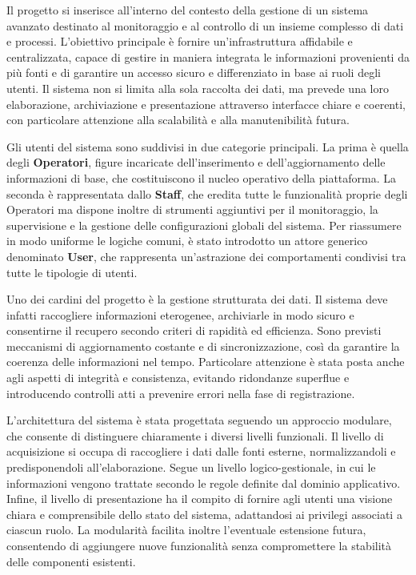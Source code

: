 \documentclass[a4paper]{report}
\begin{document}
\tableofcontents
\thispagestyle{empty}

\setcounter{page}{0}

Il progetto si inserisce all’interno del contesto della gestione di un sistema avanzato destinato al monitoraggio e al controllo di un insieme complesso di dati e processi. 
L’obiettivo principale è fornire un’infrastruttura affidabile e centralizzata, capace di gestire in maniera integrata le informazioni provenienti da più fonti e di garantire 
un accesso sicuro e differenziato in base ai ruoli degli utenti.  
Il sistema non si limita alla sola raccolta dei dati, ma prevede una loro elaborazione, archiviazione e presentazione attraverso interfacce chiare e coerenti, 
con particolare attenzione alla scalabilità e alla manutenibilità futura.

Gli utenti del sistema sono suddivisi in due categorie principali.  
La prima è quella degli \textbf{Operatori}, figure incaricate dell’inserimento e dell’aggiornamento delle informazioni di base, che costituiscono il nucleo operativo della piattaforma.  
La seconda è rappresentata dallo \textbf{Staff}, che eredita tutte le funzionalità proprie degli Operatori ma dispone inoltre di strumenti aggiuntivi per il monitoraggio, 
la supervisione e la gestione delle configurazioni globali del sistema.  
Per riassumere in modo uniforme le logiche comuni, è stato introdotto un attore generico denominato \textbf{User}, che rappresenta un’astrazione dei comportamenti condivisi 
tra tutte le tipologie di utenti.

Uno dei cardini del progetto è la gestione strutturata dei dati.  
Il sistema deve infatti raccogliere informazioni eterogenee, archiviarle in modo sicuro e consentirne il recupero secondo criteri di rapidità ed efficienza.  
Sono previsti meccanismi di aggiornamento costante e di sincronizzazione, così da garantire la coerenza delle informazioni nel tempo.  
Particolare attenzione è stata posta anche agli aspetti di integrità e consistenza, evitando ridondanze superflue e introducendo controlli atti a prevenire errori nella fase di registrazione.

L’architettura del sistema è stata progettata seguendo un approccio modulare, che consente di distinguere chiaramente i diversi livelli funzionali.  
Il livello di acquisizione si occupa di raccogliere i dati dalle fonti esterne, normalizzandoli e predisponendoli all’elaborazione.  
Segue un livello logico-gestionale, in cui le informazioni vengono trattate secondo le regole definite dal dominio applicativo.  
Infine, il livello di presentazione ha il compito di fornire agli utenti una visione chiara e comprensibile dello stato del sistema, adattandosi ai privilegi associati a ciascun ruolo.  
La modularità facilita inoltre l’eventuale estensione futura, consentendo di aggiungere nuove funzionalità senza compromettere la stabilità delle componenti esistenti.
\end{document}

